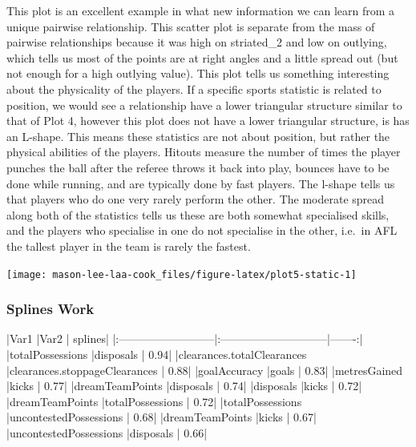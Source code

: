 This plot is an excellent example in what new information we can learn
from a unique pairwise relationship. This scatter plot is separate from
the mass of pairwise relationships because it was high on striated\_2
and low on outlying, which tells us most of the points are at right
angles and a little spread out (but not enough for a high outlying
value). This plot tells us something interesting about the physicality
of the players. If a specific sports statistic is related to position,
we would see a relationship have a lower triangular structure similar to
that of Plot 4, however this plot does not have a lower triangular
structure, is has an L-shape. This means these statistics are not about
position, but rather the physical abilities of the players. Hitouts
measure the number of times the player punches the ball after the
referee throws it back into play, bounces have to be done while running,
and are typically done by fast players. The l-shape tells us that
players who do one very rarely perform the other. The moderate spread
along both of the statistics tells us these are both somewhat
specialised skills, and the players who specialise in one do not
specialise in the other, i.e.~in AFL the tallest player in the team is
rarely the fastest.

\begin{Schunk}


\begin{center}\texttt{[image: mason-lee-laa-cook\_files/figure-latex/plot5-static-1]} \end{center}

\end{Schunk}

\hypertarget{splines-work}{%
\subsubsection{Splines Work}\label{splines-work}}

\begin{Schunk}


|Var1                       |Var2                          | splines|
|:--------------------------|:-----------------------------|-------:|
|totalPossessions           |disposals                     |    0.94|
|clearances.totalClearances |clearances.stoppageClearances |    0.88|
|goalAccuracy               |goals                         |    0.83|
|metresGained               |kicks                         |    0.77|
|dreamTeamPoints            |disposals                     |    0.74|
|disposals                  |kicks                         |    0.72|
|dreamTeamPoints            |totalPossessions              |    0.72|
|totalPossessions           |uncontestedPossessions        |    0.68|
|dreamTeamPoints            |kicks                         |    0.67|
|uncontestedPossessions     |disposals                     |    0.66|

\end{Schunk}

